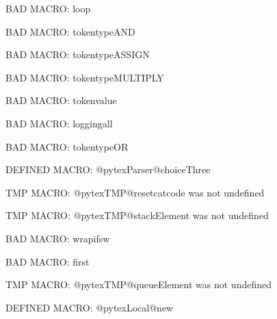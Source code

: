 BAD MACRO: loop

BAD MACRO: tokentypeAND

BAD MACRO: tokentypeASSIGN

BAD MACRO: tokentypeMULTIPLY

BAD MACRO: tokenvalue

BAD MACRO: loggingall

BAD MACRO: tokentypeOR

\ifx\@pytexParser@choiceThree\undefined\else DEFINED MACRO: @pytexParser@choiceThree
\fi

\ifx\@pytexTMP@resetcatcode\undefined\else TMP MACRO: @pytexTMP@resetcatcode was not undefined
\fi

\ifx\@pytexTMP@stackElement\undefined\else TMP MACRO: @pytexTMP@stackElement was not undefined
\fi

BAD MACRO: wrapifsw

BAD MACRO: first

\ifx\@pytexTMP@queueElement\undefined\else TMP MACRO: @pytexTMP@queueElement was not undefined
\fi

\ifx\@pytexLocal@new\undefined\else DEFINED MACRO: @pytexLocal@new
\fi

